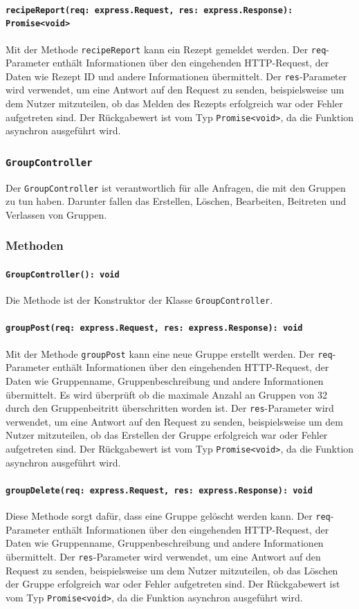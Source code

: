 \documentclass{entwurfsheft}
\begin{document}
\paragraph{\texttt{recipeReport(req: express.Request, res: express.Response): Promise<void>}}
Mit der Methode \texttt{recipeReport} kann ein Rezept gemeldet werden. Der \texttt{req}-Parameter enthält Informationen über den eingehenden HTTP-Request, der Daten wie Rezept ID und andere Informationen übermittelt. Der \texttt{res}-Parameter wird verwendet, um eine Antwort auf den Request zu senden, beispielsweise um dem Nutzer mitzuteilen, ob das Melden des Rezepts erfolgreich war oder Fehler aufgetreten sind.
Der Rückgabewert ist vom Typ \texttt{Promise<void>}, da die Funktion asynchron ausgeführt wird.

\subsubsection{\texttt{GroupController}}\label{sec:GroupController}
Der \texttt{GroupController} ist verantwortlich für alle Anfragen, die mit den Gruppen zu tun haben. Darunter fallen das Erstellen, Löschen, Bearbeiten, Beitreten und Verlassen von Gruppen.
\subsubsection*{Methoden}
\paragraph{\texttt{GroupController(): void}}
Die Methode ist der Konstruktor der Klasse \texttt{GroupController}.
\paragraph{\texttt{groupPost(req: express.Request, res: express.Response): void}}
Mit der Methode \texttt{groupPost} kann eine neue Gruppe erstellt werden. Der \texttt{req}-Parameter enthält Informationen über den eingehenden HTTP-Request, der Daten wie Gruppenname, Gruppenbeschreibung und andere Informationen übermittelt. Es wird überprüft ob die maximale Anzahl an Gruppen von 32 durch den Gruppenbeitritt überschritten worden ist. Der \texttt{res}-Parameter wird verwendet, um eine Antwort auf den Request zu senden, beispielsweise um dem Nutzer mitzuteilen, ob das Erstellen der Gruppe erfolgreich war oder Fehler aufgetreten sind.
Der Rückgabewert ist vom Typ \texttt{Promise<void>}, da die Funktion asynchron ausgeführt wird.
\paragraph{\texttt{groupDelete(req: express.Request, res: express.Response): void}}
Diese Methode sorgt dafür, dass eine Gruppe gelöscht werden kann. Der \texttt{req}-Parameter enthält Informationen über den eingehenden HTTP-Request, der Daten wie Gruppenname, Gruppenbeschreibung und andere Informationen übermittelt. Der \texttt{res}-Parameter wird verwendet, um eine Antwort auf den Request zu senden, beispielsweise um dem Nutzer mitzuteilen, ob das Löschen der Gruppe erfolgreich war oder Fehler aufgetreten sind.
Der Rückgabewert ist vom Typ \texttt{Promise<void>}, da die Funktion asynchron ausgeführt wird.
\end{document}

